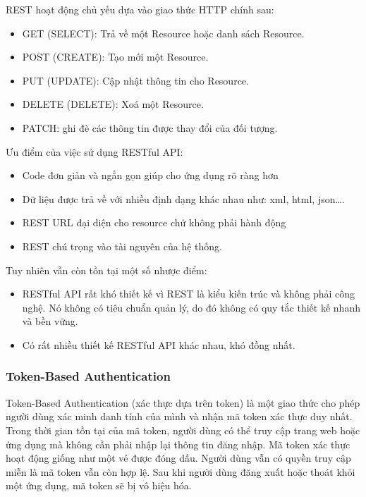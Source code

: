 REST hoạt động chủ yếu dựa vào giao thức HTTP chính sau:
\begin{itemize}
    \item GET (SELECT): Trả về một Resource hoặc danh sách Resource.
    \item POST (CREATE): Tạo mới một Resource.
    \item PUT (UPDATE): Cập nhật thông tin cho Resource.
    \item DELETE (DELETE): Xoá một Resource.
    \item PATCH: ghi đè các thông tin được thay đổi của đối tượng.
\end{itemize}

Ưu điểm của việc sử dụng RESTful API:
\begin{itemize}
    \item Code đơn giản và ngắn gọn giúp cho ứng dụng rõ ràng hơn
    \item Dữ liệu được trả về với nhiều định dạng khác nhau như: xml, html, json….
    \item REST URL đại diện cho resource chứ không phải hành động
    \item REST chú trọng vào tài nguyên của hệ thống.
\end{itemize}

Tuy nhiên vẫn còn tồn tại một số nhược điểm:
\begin{itemize}
    \item RESTful API rất khó thiết kế vì REST là kiểu kiến trúc và không phải công nghệ. Nó không có tiêu chuẩn quản lý, do đó không có quy tắc thiết kế nhanh và bền vững.
    \item Có rất nhiều thiết kế RESTful API khác nhau, khó đồng nhất.
\end{itemize}

\subsubsection{Token-Based Authentication}
Token-Based Authentication (xác thực dựa trên token) là một giao thức cho phép người dùng xác minh danh tính của mình và nhận mã token xác thực duy nhất. Trong thời gian tồn tại của mã token, người dùng có thể truy cập trang web hoặc ứng dụng mà không cần phải nhập lại thông tin đăng nhập. Mã token xác thực hoạt động giống như một vé được đóng dấu. Người dùng vẫn có quyền truy cập miễn là mã token vẫn còn hợp lệ. Sau khi người dùng đăng xuất hoặc thoát khỏi một ứng dụng, mã token sẽ bị vô hiệu hóa.\par

